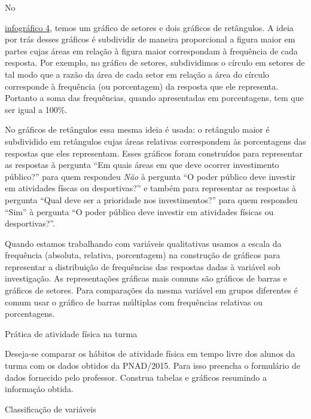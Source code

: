 No {\hyperref[est1-fig-5]{infográfico 4}, temos um gráfico de setores e dois gráficos de retângulos. A ideia por trás desses gráficos é subdividir de maneira proporcional a figura maior em partes cujas áreas em relação à figura maior correspondam à frequência de cada resposta. Por exemplo, no gráfico de setores, subdividimos o círculo em setores de tal modo que a razão da área de cada setor em relação a área do círculo corresponde à frequência (ou porcentagem) da resposta que ele representa. Portanto a soma das frequências, quando apresentadas em porcentagens, tem que ser igual a 100$\%$.

No gráficos de retângulos essa mesma ideia é usada: o retângulo maior é subdividido em retângulos cujas áreas relativas correspondem às porcentagens das respostas que eles representam. Esses gráficos foram construídos para representar as respostas à pergunta ``Em quais áreas em que deve ocorrer investimento público?'' para quem respondeu \emph{Não} à pergunta ``O poder público deve investir em atividades físcas ou desportivas?'' e também para representar as respostas à pergunta ``Qual deve ser a prioridade nos investimentos?'' para quem respondeu ``Sim'' à pergunta ``O poder público deve investir em atividades físicas ou desportivas?''.

\begin{observation}{}

Quando estamos trabalhando com variáveis qualitativas usamos a escala da frequência (absoluta, relativa, porcentagem)  na construção de gráficos para representar a distribuição de frequências das respostas dadas à variável sob investigação. As representações gráficas mais comuns são gráficos de barras e gráficos de setores. Para comparações da mesma variável em grupos diferentes é comum usar o gráfico de barras múltiplas com frequências relativas ou porcentagens.
\end{observation}

\practice{ }
\label{est1-prac-1}

\label{est1-ativ-5}
\begin{task}{ Prática de atividade física na turma}


Deseja-se comparar os hábitos de atividade física em tempo livre dos alunos da turma com os dados obtidos da PNAD/2015. Para isso preencha o formulário de dados fornecido pelo professor. Construa tabelas e gráficos resumindo a informação obtida.
\end{task}
\label{est1-ativ-6}
\begin{task}{ Classificação de variáveis}


\end{task}}
